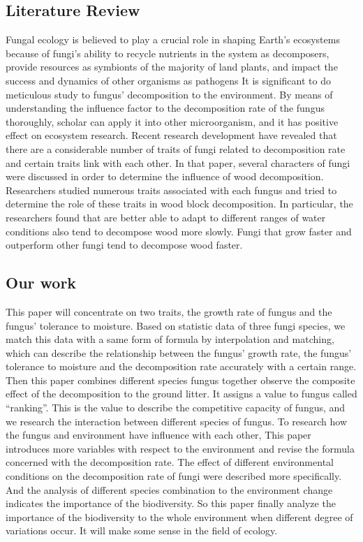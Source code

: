 \documentclass{mcmthesis}
\begin{document}
\subsection{Literature Review}
Fungal ecology is believed to play a crucial role in shaping Earth’s ecosystems because of fungi’s ability to recycle nutrients in the system as decomposers\cite{Fricker2017The}, provide resources as symbionts of the majority of land plants\cite{Treseder2015Fungal}, and impact the success and dynamics of other organisms as pathogens\cite{Smith2008Mycorrhizal,Maron2011Soil} 
It is significant to do meticulous study to fungus’ decomposition to the environment. 
By means of understanding the influence factor to the decomposition rate of the fungus thoroughly, scholar can apply it into other microorganism, and it has positive effect on ecosystem research. 
Recent research development have revealed that there are a considerable number of traits of fungi related to decomposition rate and certain traits link with each other\cite{Lustenhouwer11551}.
In that paper, several characters of fungi were discussed in order to determine the influence of wood decomposition. 
Researchers studied numerous traits associated with each fungus and tried to determine the role of these traits in wood block decomposition. 
In particular, the researchers found that are better able to adapt to different ranges of water conditions also tend to decompose wood more slowly. 
Fungi that grow faster and outperform other fungi tend to decompose wood faster\cite{Lustenhouwer11551}.

\subsection{Our work}
This paper will concentrate on two traits, the growth rate of fungus and the fungus’ tolerance to moisture. 
Based on statistic data of three fungi species, we match this data with a same form of formula by interpolation and matching, which can describe the relationship between the fungus’ growth rate, the fungus’ tolerance to moisture and the decomposition rate accurately with a certain range. 
Then this paper combines different species fungus together observe the composite effect of the decomposition to the ground litter. 
It assigns a value to fungus called “ranking”. 
This is the value to describe the competitive capacity of fungus, and we research the interaction between different species of fungus. 
To research how the fungus and environment have influence with each other, This paper introduces more variables with respect to the environment and revise the formula concerned with the decomposition rate. 
The effect of different environmental conditions on the decomposition rate of fungi were described more specifically. 
And the analysis of different species combination to the environment change indicates the importance of the biodiversity.
So this paper finally analyze the importance of the biodiversity to the whole environment when different degree of variations occur. 
It will make some sense in the field of ecology.
\end{document}
